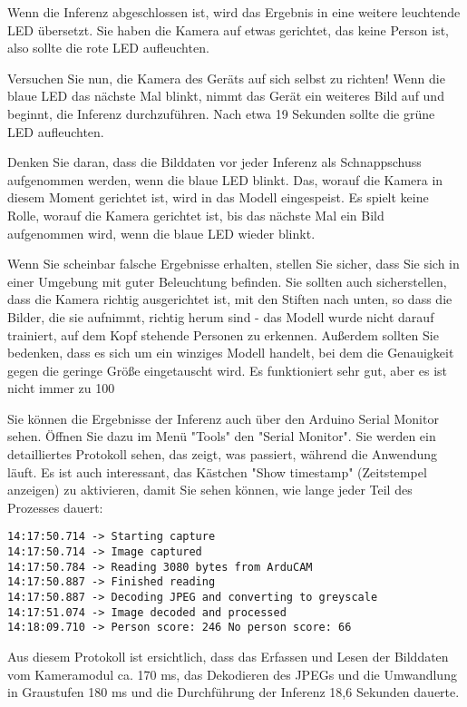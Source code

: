 Wenn die Inferenz abgeschlossen ist, wird das Ergebnis in eine weitere leuchtende LED übersetzt. Sie haben die Kamera auf etwas gerichtet, das keine Person ist, also sollte die rote LED aufleuchten.

Versuchen Sie nun, die Kamera des Geräts auf sich selbst zu richten! Wenn die blaue LED das nächste Mal blinkt, nimmt das Gerät ein weiteres Bild auf und beginnt, die Inferenz durchzuführen. Nach etwa 19 Sekunden sollte die grüne LED aufleuchten.

Denken Sie daran, dass die Bilddaten vor jeder Inferenz als Schnappschuss aufgenommen werden, wenn die blaue LED blinkt. Das, worauf die Kamera in diesem Moment gerichtet ist, wird in das Modell eingespeist. Es spielt keine Rolle, worauf die Kamera gerichtet ist, bis das nächste Mal ein Bild aufgenommen wird, wenn die blaue LED wieder blinkt.

Wenn Sie scheinbar falsche Ergebnisse erhalten, stellen Sie sicher, dass Sie sich in einer Umgebung mit guter Beleuchtung befinden. Sie sollten auch sicherstellen, dass die Kamera richtig ausgerichtet ist, mit den Stiften nach unten, so dass die Bilder, die sie aufnimmt, richtig herum sind - das Modell wurde nicht darauf trainiert, auf dem Kopf stehende Personen zu erkennen. Außerdem sollten Sie bedenken, dass es sich um ein winziges Modell handelt, bei dem die Genauigkeit gegen die geringe Größe eingetauscht wird. Es funktioniert sehr gut, aber es ist nicht immer zu 100 %

Sie können die Ergebnisse der Inferenz auch über den Arduino Serial Monitor sehen. Öffnen Sie dazu im Menü "Tools" den "Serial Monitor". Sie werden ein detailliertes Protokoll sehen, das zeigt, was passiert, während die Anwendung läuft. Es ist auch interessant, das Kästchen "Show timestamp" (Zeitstempel anzeigen) zu aktivieren, damit Sie sehen können, wie lange jeder Teil des Prozesses dauert:




\begin{code}
    \begin{lstlisting}
14:17:50.714 -> Starting capture
14:17:50.714 -> Image captured
14:17:50.784 -> Reading 3080 bytes from ArduCAM
14:17:50.887 -> Finished reading
14:17:50.887 -> Decoding JPEG and converting to greyscale
14:17:51.074 -> Image decoded and processed
14:18:09.710 -> Person score: 246 No person score: 66
  \end{lstlisting}
\end{code}

Aus diesem Protokoll ist ersichtlich, dass das Erfassen und Lesen der Bilddaten vom Kameramodul ca. 170 ms, das Dekodieren des JPEGs und die Umwandlung in Graustufen 180 ms und die Durchführung der Inferenz 18,6 Sekunden dauerte.

